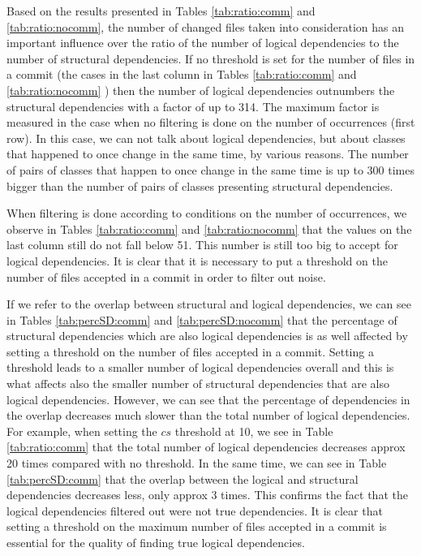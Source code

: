 \documentclass[a4paper,twoside]{article}
\begin{document}
Based on the results presented in Tables \ref{tab:ratio:comm} and \ref{tab:ratio:nocomm}, the number 
of changed files taken into consideration has an important influence over the ratio of the number  of 
logical dependencies to the number of structural dependencies.  If no threshold is set for the number of files in a commit (the cases in the last column in Tables \ref{tab:ratio:comm} and 
\ref{tab:ratio:nocomm} ) then the number of logical dependencies outnumbers the structural dependencies with a factor of up to 314. The maximum factor is measured in the case when no filtering is done on the number of occurrences (first row).  
In this case, we can not talk about logical dependencies, but about classes that happened to once change in the same time, by various reasons. The number of pairs of classes that happen to once change in the same time is up to 300 times bigger than the number of pairs of classes presenting structural dependencies.

When filtering is done according to conditions on the number of occurrences, we observe in Tables \ref{tab:ratio:comm} and \ref{tab:ratio:nocomm} that the values on the last column still do not fall below 51. This number is still too big to accept for logical dependencies.  It is clear that it is necessary to  put a threshold on the number of files accepted in a commit in order to filter out noise.


If we refer to the overlap between structural and logical dependencies, we can see in Tables \ref{tab:percSD:comm} and \ref{tab:percSD:nocomm} that the percentage of structural dependencies which are also logical dependencies is as well affected by setting a threshold on the number of files accepted in a commit. Setting a threshold leads to a smaller number of logical dependencies overall and this is what affects also the smaller number of structural dependencies that are also logical dependencies. However, we can see that the percentage of dependencies in the overlap decreases much slower than the total number of logical dependencies. For example, when setting  the $cs$ threshold at 10, we see in Table \ref{tab:ratio:comm} that the total number of logical dependencies decreases approx 20 times compared with no threshold. In the same time, we can see in Table \ref{tab:percSD:comm}  that the overlap between the logical and structural dependencies decreases less, only approx 3 times. This confirms the fact that the logical dependencies filtered out were not true dependencies. It is clear that setting a threshold on the maximum number of files accepted in a commit is essential for the quality of finding true logical dependencies.
\end{document}
